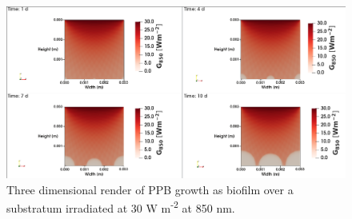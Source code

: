 \begin{figure}[H]
    \centering
    \includegraphics[width=\textwidth,height=0.4\textheight]{Chap4/results/post_processing/2D_cases/case6_rad.png}
    \caption{Three dimensional render of PPB growth as biofilm over a substratum irradiated at 30 W m\textsuperscript{-2} at 850 nm. } 
    \label{fig:case5_3D_rad}
\end{figure}










